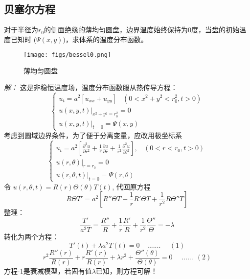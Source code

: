 \subsection{贝塞尔方程}
\begin{example}
	对于半径为$r_0$的侧面绝缘的薄均匀圆盘，边界温度始终保持为0度，当盘的初始温度已知时 ($\Psi(x,y)$)，求体系的温度分布函数。
\end{example}
\begin{figure}[h]
	\centering
	\texttt{[image: figs/bessel0.png]}
	\caption{薄均匀圆盘}
\end{figure}
\emph{解：}
	这是非稳恒温度场，温度分布函数服从热传导方程：
	\begin{equation}\label{eq:bessel0}
		\begin{cases}
		u_t=a^2 [u_{xx}   +u_{yy}] ~~~~ (0< x^2 +y^2 <r_0 ^2, t>0)\\
		u(x,y,t)|_{x^2+y^2=r_0 ^2}= 0 \\
		u(x,y,t)|_{t=0}= \Psi(x,y)
	\end{cases} 
    \end{equation}
	考虑到圆域边界条件，为了便于分离变量，应改用极坐标系
	$$\begin{cases}
		\displaystyle	u_t=a^2 [ {	\frac{\partial^2 u }{\partial r^2 } +\frac{1}{r } \frac{\partial u }{\partial r } +
		\frac{1}{r^2 } \frac{\partial ^2 u }{\partial \theta ^2
		} }], ~~~~ (0<r<r_0, t>0)\\
		u(r,\theta)|_{r=r_0}=0 	\\
		u(r,\theta,t)|_{t=0} = \Psi(r,\theta) 	
	\end{cases} $$
	令 $u(r,\theta,t) =R(r)\Theta(\theta)T(t)$,  代回原方程
	\begin{equation*}
		R\Theta T'=a^2 [ R'' \Theta T + \dfrac{1}{r} R' \Theta T  + \dfrac{1}{r^2} R \Theta '' T ]
	\end{equation*}
	整理：
	\begin{equation*}
		\frac{T'}{a^2T} =\frac{R''}{R}+\frac{1}{r} \frac{R'}{R} +\frac{1}{r^2} \frac{\Theta ''} {\Theta}  =-\lambda
	\end{equation*}
	转化为两个方程：
	\begin{equation*}
		T'(t)+\lambda a^2T(t)=0  ~~~~~....... ~~~~~~(1)
	\end{equation*}	
	\begin{equation*}
		r^2 \frac{R'' (r)}{R(r)}+r \frac{R'(r)}{R(r)} + \lambda r^2 +\frac{\Theta ''(\theta)} {\Theta (\theta)} =0  ~~~~~~......~~(2)
	\end{equation*}
	方程-1是衰减模型，若固有值$\lambda$已知，则方程可解！\\
